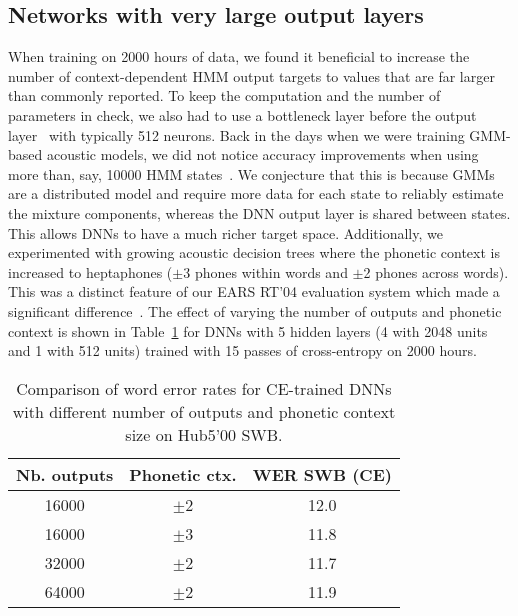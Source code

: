 \documentclass[a4paper]{article}
\begin{document}
\subsection{Networks with very large output layers}
\label{vlol}

When training on 2000 hours of data, we found it beneficial to
increase the number of context-dependent HMM output targets to values
that are far larger than commonly reported. To keep the computation
and the number of parameters in check, we also had to use a bottleneck
layer before the output layer~\cite{sainath13} with typically 512
neurons. Back in the days when we were training GMM-based acoustic
models, we did not notice accuracy improvements when using more than,
say, 10000 HMM states~\cite{soltau05}. We conjecture that this is
because GMMs are a distributed model and require more data for each
state to reliably estimate the mixture components, whereas the DNN
output layer is shared between states. This allows DNNs to have a much
richer target space. Additionally, we experimented with growing
acoustic decision trees where the phonetic context is increased to
heptaphones ($\pm$3 phones within words and $\pm$2 phones across
words). This was a distinct feature of our EARS RT'04 evaluation
system which made a significant difference~\cite{soltau05}. The effect of
varying the number of outputs and phonetic context is shown in
Table~\ref{vlol-tab} for DNNs with 5 hidden layers (4 with 2048 units
and 1 with 512 units) trained with 15 passes of cross-entropy on 2000 hours.

\begin{table}[htpb!]
\begin{center}
\begin{tabular}{|c|c|c|} \hline
Nb. outputs  & Phonetic ctx. & WER SWB (CE)\\ \hline 
16000        & $\pm$2        & 12.0 \\ 
16000        & $\pm$3        & 11.8 \\ \hline
32000        & $\pm$2        & 11.7 \\ \hline
64000        & $\pm$2        & 11.9 \\ \hline
\end{tabular}
\end{center}
\caption{\label{vlol-tab}
Comparison of word error rates for CE-trained DNNs with different number of outputs and phonetic context size on Hub5'00 SWB.}
\end{table}
\end{document}
